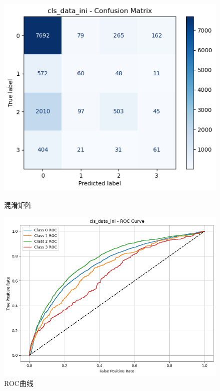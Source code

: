 \documentclass[10pt]{article}
\begin{document}
\begin{figure}[H]
\centering
\begin{minipage}[t]{0.45\textwidth}
  \centering
  \includegraphics[width=\linewidth]{cls_nb_ini1.png}
  \caption{混淆矩阵}
  \label{fig:15}
\end{minipage}
\hfill
\begin{minipage}[t]{0.52\textwidth}
  \centering
  \includegraphics[width=\linewidth]{cls_nb_ini2.png}
  \caption{ROC曲线}
  \label{fig:16}
\end{minipage}
\end{figure}
\end{document}
